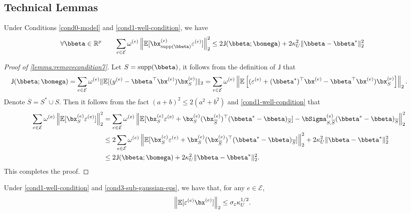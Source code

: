 \documentclass[10pt]{article}
\numberwithin{equation}{section}
\newcommand*{\supp}{\mathrm{supp}}
\begin{document}
\subsection{Technical Lemmas}

\begin{lemma}
\label{lemma:removecondition7}
Under Conditions \ref{cond0-model} and \ref{cond1-well-condition}, we have
\begin{align*}
    \forall \bbeta \in \mathbb{R}^p \qquad \sum_{e\in \mathcal{E}} \omega^{(e)} \left\|\mathbb{E}[\bx_{\supp(\bbeta)}^{(e)} \varepsilon^{(e)}] \right\|_2^2 \le 2 \mathsf{J}(\bbeta;\bomega) + 2\kappa_U^2 \|\bbeta - \bbeta^*\|_2^2
\end{align*}
\end{lemma}
\begin{proof}[Proof of \cref{lemma:removecondition7}]
Let $S=\supp(\bbeta)$, it follows from the definition of $\mathsf{J}$ that
\begin{align*}
    \mathsf{J}(\bbeta;\bomega) = \sum_{e\in \mathcal{E}} \omega^{(e)} \|\mathbb{E}[(y^{(e)} - \bbeta^\top \bx^{(e)}) \bx_S^{(e)}]\|_2
    &= \sum_{e\in \mathcal{E}} \omega^{(e)} \left\|\mathbb{E}\left[(\varepsilon^{(e)} + (\bbeta^*)^\top \bx^{(e)} - \bbeta^\top \bx^{(e)}) \bx_S^{(e)}\right]\right\|_2.
\end{align*} Denote $\overline{S} = S^* \cup S$. Then it follows from the fact $(a+b)^2 \le 2(a^2+b^2)$ and \cref{cond1-well-condition} that
\begin{align*}
    \qquad \sum_{e\in \mathcal{E}} \omega^{(e)} \left\|\mathbb{E}[\bx_{S}^{(e)} \varepsilon^{(e)}] \right\|_2^2 &= \sum_{e\in \mathcal{E}} \omega^{(e)} \left\|\mathbb{E}[\bx_S^{(e)} \varepsilon^{(e)} + \bx_S^{(e)} (\bx^{(e)}_{\overline{S}})^\top  (\bbeta^*-\bbeta)_{\overline{S}} ] - \bSigma^{(e)}_{S,\overline{S}} (\bbeta^*-\bbeta)_{\overline{S}}\right\|_2^2 \\
    &\le 2 \sum_{e\in \mathcal{E}} \omega^{(e)} \left\|\mathbb{E}[\bx_S^{(e)} \varepsilon^{(e)} + \bx_S^{(e)} (\bx^{(e)}_{\overline{S}})^\top  (\bbeta^*-\bbeta)_{\overline{S}} ]\right\|_2^2 + 2\kappa_U^2 \|\bbeta - \bbeta^*\|_2^2 \\
    &\le 2\mathsf{J}(\bbeta;\bomega) + 2\kappa_U^2 \|\bbeta - \bbeta^*\|_2^2.
\end{align*} This completes the proof.
\end{proof}


\begin{lemma}
\label{lemma:x-product-epsilon}
Under \cref{cond1-well-condition} and \cref{cond3-sub-gaussian-eps}, we have that, for any $e\in \mathcal{E}$,
\begin{align*}
\left\| \mathbb{E}[\varepsilon^{(e)} \bx^{(e)}]	\right\|_2 \le \sigma_\varepsilon \kappa_U^{1/2}.
\end{align*}
\end{lemma}
\end{document}
